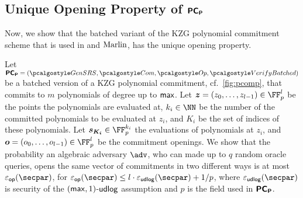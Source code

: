 \subsection{Unique Opening Property of $\bm{\mathsf{PC}}_{\bm{\mathsf{P}}}$}
\label{sec:uop}
Now, we show that the batched variant of the KZG polynomial
commitment scheme that is used in \plonk{} and ${\textnormal{{Marlin}}}{}$, has the unique opening property.

\begin{lemma}
\label{lem:pcomp_op}
Let $\PCOMp = (\kgen, \com, \open, \verifyb)$ be a batched version of a KZG polynomial commitment,
cf.~\cref{fig:pcomp}, that commits to $m$ polynomials of degree up to $\mathsf{max}$. Let $\vec{z} = (z_0, \ldots, z_{l - 1}) \in \FF_p^l$ be the points the polynomials are  evaluated at, $k_i \in \NN$ be the number of the committed polynomials to be evaluated at $z_i$, and $K_i$ be the set of indices of these polynomials. Let $\vec{s_{K_i}} \in \FF_p^{k_i}$ the evaluations of polynomials at $z_i$, and $\vec{o} = (o_0, \ldots, o_{l - 1}) \in \FF_p^l$ be the commitment openings. We show that the probability an algebraic adversary $\adv$, who can made up to $q$ random oracle queries, opens the same vector of commitments in two different ways is at most $\epsop(\secpar)$, for $\epsop(\secpar) \leq l \cdot  \epsudlog(\secpar) + \infrac{1}{p}$, where $\epsudlog(\secpar)$ is security of the $(\mathsf{max}, 1)$-$\mathsf{udlog}$ assumption and $p$ is the field used in $\bm{\mathsf{PC}}_{\bm{\mathsf{P}}}$.
\end{lemma}
